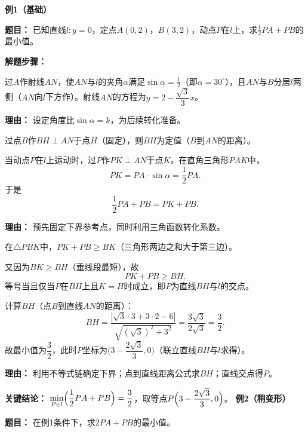 \begin{examplebox}
	\textbf{\textcolor{CExample}{例1（基础）}}

	\textbf{\textcolor{CExample}{题目：}}
	已知直线$l:y=0$，定点$A(0,2)$，$B(3,2)$，动点$P$在$l$上，求$\displaystyle\frac12PA+PB$的最小值。

	\textbf{\textcolor{CExample}{解题步骤：}}
	\begin{description}[style=nextline, leftmargin=2.8em, labelsep=0.5em, itemsep=0.45em]
		\item[\textbf{第一步（构造定角）：}] 过$A$作射线$AN$，使$AN$与$l$的夹角$\alpha$满足$\sin\alpha=\frac12$（即$\alpha=30^\circ$），且$AN$与$B$分居$l$两侧（$AN$向$l$下方作）。射线$AN$的方程为$y=2-\dfrac{\sqrt3}{3}x$。
			\par\textbf{理由：} 设定角度比$\sin\alpha=k$，为后续转化准备。

		\item[\textbf{第二步（转化与构造）：}]
			过点$B$作$BH\perp AN$于点$H$（固定），则$BH$为定值（$B$到$AN$的距离）。\par
			当动点$P$在$l$上运动时，过$P$作$PK\perp AN$于点$K$。在直角三角形$PAK$中，
			\[
				PK = PA\cdot\sin\alpha = \dfrac12 PA.
			\]
			于是
			\[
				\frac12PA+PB = PK+PB.
			\]
			\par\textbf{理由：} 预先固定下界参考点，同时利用三角函数转化系数。

		\item[\textbf{第三步（求最值）：}]
			在$\triangle PBK$中，$PK+PB \ge BK$（三角形两边之和大于第三边）。\par
			又因为$BK \ge BH$（垂线段最短），故
			\[
				PK+PB \ge BH.
			\]
			等号当且仅当$P$在$BH$上且$K=H$时成立，即$P$为直线$BH$与$l$的交点。\par
			计算$BH$（点$B$到直线$AN$的距离）：
			\[
				BH = \frac{|\sqrt3\cdot3+3\cdot2-6|}{\sqrt{(\sqrt3)^2+3^2}} = \frac{3\sqrt3}{2\sqrt3}= \frac32.
			\]
			故最小值为$\dfrac32$，此时$P$坐标为$\bigl(3-\dfrac{2\sqrt3}{3},0\bigr)$（联立直线$BH$与$l$求得）。
			\par\textbf{理由：} 利用不等式链确定下界；点到直线距离公式求$BH$；直线交点得$P$。
	\end{description}

	\textbf{\textcolor{CExample}{关键结论：}}
	$\displaystyle\min_{P\in l}\Bigl(\frac12PA+PB\Bigr)=\frac32$，取等点$P\Bigl(3-\dfrac{2\sqrt3}{3},0\Bigr)$。
	\medskip
	\textbf{\textcolor{CExample}{例2（稍变形）}}

	\textbf{\textcolor{CExample}{题目：}}
	在例1条件下，求$2PA+PB$的最小值。


\end{examplebox}
